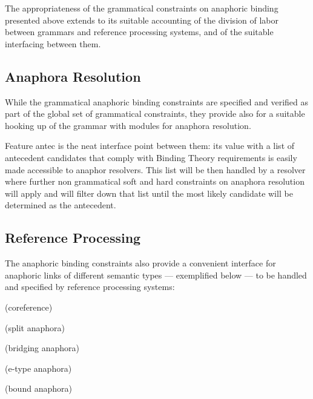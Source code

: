 \documentclass[output=paper
	        ,collection
	        ,collectionchapter
 	        ,biblatex
                ,babelshorthands
                ,newtxmath
                ,draftmode
                ,colorlinks, citecolor=brown
]{langscibook}
\begin{document}
The appropriateness of the grammatical constraints on anaphoric binding presented above
extends to its suitable accounting of the division 
of labor between grammars and reference processing systems, and of the suitable interfacing between them.

\subsection{Anaphora Resolution \label{resolvers}}

While the grammatical anaphoric binding
constraints are specified and verified as part of the global set of grammatical
constraints, they provide also for a suitable hooking up of the grammar
with modules for anaphora resolution.

Feature {\sc antec} is the neat
interface point between them: its value with a list of antecedent
candidates that comply with Binding Theory requirements
is easily made accessible to anaphor resolvers. This list will be then handled by a
resolver where further non grammatical soft and hard constraints
on anaphora resolution will apply and will filter down that list
until the most likely candidate will be determined as the antecedent.

\subsection{Reference Processing\label{semanticTypes}}

The anaphoric binding constraints also provide a convenient interface for anaphoric links 
of different semantic types ---  exemplified below --- to be handled
and specified by reference processing systems:

\begin{exe}
\ex

\begin{xlist}

 (coreference)
\label{anTypes}

 (split anaphora)
\label{anTypesb}

 (bridging anaphora)
\label{anTypesc}

 (e-type anaphora)
\label{anTypesd}

 (bound anaphora)
\label{anTypese}

\end{xlist}
\end{exe}
\end{document}
